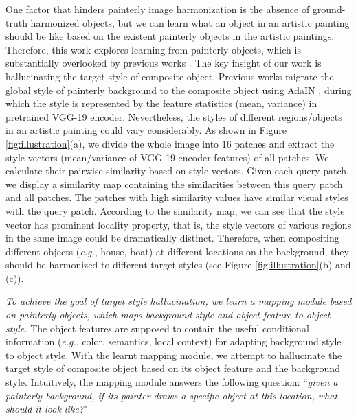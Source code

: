 \documentclass[letterpaper]{article} %
\begin{document}
One factor that hinders painterly image harmonization is the absence of ground-truth harmonized objects, but we can learn what an object in an artistic painting should be like based on the existent painterly objects in the artistic paintings. Therefore, this work explores learning from painterly objects, which is substantially overlooked by previous works \cite{luan2018deep,peng2019element,cao2022painterly,yan2022style}. The key insight of our work is hallucinating the target style of composite object. Previous works \cite{peng2019element,cao2022painterly} migrate the global style of painterly background to the composite object using AdaIN \cite{huang2017arbitrary}, during which the style is represented by the feature statistics (mean, variance) in pretrained VGG-19 \cite{VGG19} encoder. Nevertheless, the styles of different regions/objects in an artistic painting could vary considerably. As shown in Figure \ref{fig:illustration}(a), we divide the whole image into $16$ patches and extract the style vectors (mean/variance of VGG-19 encoder features) of all patches. We calculate their pairwise similarity based on style vectors. Given each query patch, we display a similarity map containing the similarities between this query patch and all patches.
The patches with high similarity values have similar visual styles with the query patch.
According to the similarity map, we can see that the style vector has prominent locality property, that is, the style vectors of various regions in the same image could be dramatically distinct.
Therefore, when compositing different objects (\emph{e.g.}, house, boat) at different locations on the background, they should be harmonized to different target styles (see Figure \ref{fig:illustration}(b) and (c)).

\emph{To achieve the goal of target style hallucination, we learn a mapping module based on painterly objects, which maps background style and object feature to object style.} The object features are supposed to contain the useful conditional information (\emph{e.g.}, color, semantics, local context) for adapting background style to object style. With the learnt mapping module, we attempt to hallucinate the target style of composite object based on its object feature and the background style. Intuitively, the mapping module answers the following question: ``\emph{given a painterly background, if its painter draws a specific object at this location, what should it look like?}"
\end{document}
